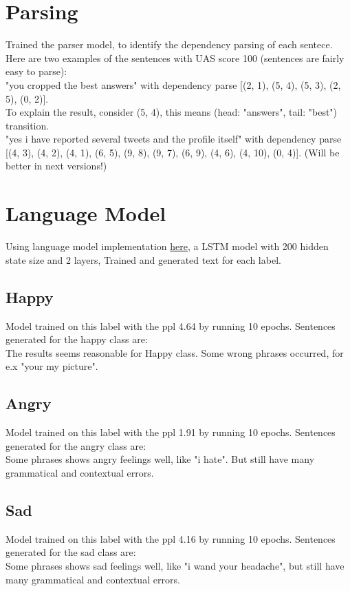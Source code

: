 \documentclass[a4paper]{article}
\begin{document}
\section{Parsing}
Trained the parser model, to identify the dependency parsing of each sentece. Here are two examples of the sentences with UAS score 100 (sentences are fairly easy to parse):\\
"you cropped the best answers" with dependency parse [(2, 1), (5, 4), (5, 3), (2, 5), (0, 2)].\\ 
To explain the result, consider (5, 4), this means (head: "answers", tail: "best") transition.\\
"yes i have reported several tweets and the profile itself" with dependency parse [(4, 3), (4, 2), (4, 1), (6, 5), (9, 8), (9, 7), (6, 9), (4, 6), (4, 10), (0, 4)]. (Will be better in next versions!)
\section{Language Model}
Using language model implementation \href{https://github.com/pytorch/examples}{here}, a LSTM model with 200 hidden state size and 2 layers, Trained and generated text for each label.
\subsection{Happy}
Model trained on this label with the ppl 4.64 by running 10 epochs. Sentences generated for the happy class are:\\

The results seems reasonable for Happy class. Some wrong phrases occurred, for e.x "your my picture".\\
\subsection{Angry}
Model trained on this label with the ppl 1.91 by running 10 epochs. Sentences generated for the angry class are:\\

Some phrases shows angry feelings well, like "i hate". But still have many grammatical and contextual errors.\\
\subsection{Sad}
Model trained on this label with the ppl 4.16 by running 10 epochs. Sentences generated for the sad class are:\\

Some phrases shows sad feelings well, like "i wand your headache", but still have many grammatical and contextual errors.\\
\end{document}
